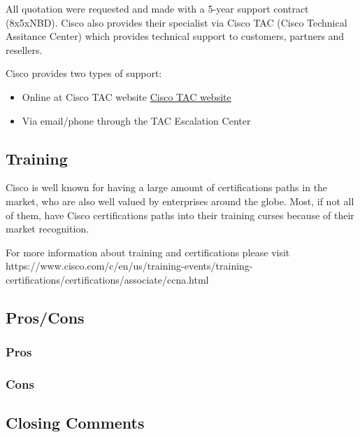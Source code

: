 All quotation were requested and made with a 5-year support contract (8x5xNBD). Cisco also provides their specialist via Cisco TAC (Cisco Technical Assitance Center) which provides technical support to customers, partners and resellers.

Cisco provides two types of support:

\begin{itemize}
    \item Online at Cisco TAC website \href{http://www.cisco.com/tac}{Cisco TAC website}
    \item Via email/phone through the TAC Escalation Center
\end{itemize}

\subsection{Training}

Cisco is well known for having a large amount of certifications paths in the market, who are also well valued by enterprises around the globe. Most, if not all of them, have Cisco certifications paths into their training curses because of their market recognition.

For more information about training and certifications please visit https://www.cisco.com/c/en/us/training-events/training-certifications/certifications/associate/ccna.html
\subsection{Pros/Cons}

\subsubsection{Pros}

\subsubsection{Cons}

\subsection{Closing Comments}
